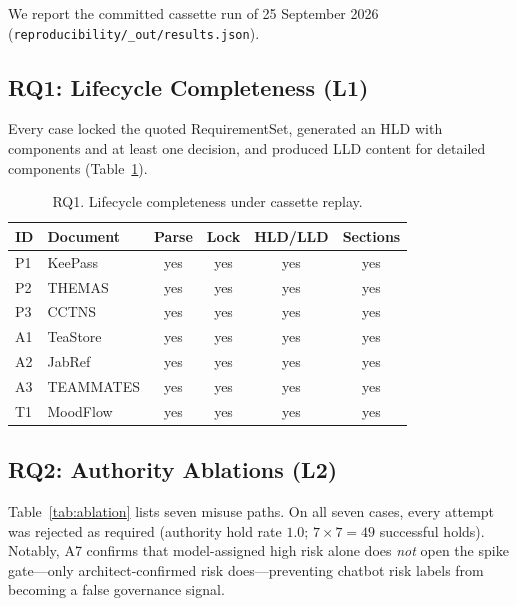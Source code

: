 \documentclass[conference]{IEEEtran}
\begin{document}
We report the committed cassette run of 25 September 2026 (\texttt{reproducibility/\_out/results.json}).

\subsection{RQ1: Lifecycle Completeness (L1)}
Every case locked the quoted RequirementSet, generated an HLD with components and at least one decision, and produced LLD content for detailed components (Table~\ref{tab:rq1}).

\begin{table}[!t]
\caption{RQ1. Lifecycle completeness under cassette replay.}
\label{tab:rq1}
\centering
\small
\begin{tabular}{@{}llcccc@{}}
\toprule
ID & Document & Parse & Lock & HLD/LLD & Sections \\
\midrule
P1 & KeePass & yes & yes & yes & yes \\
P2 & THEMAS & yes & yes & yes & yes \\
P3 & CCTNS & yes & yes & yes & yes \\
A1 & TeaStore & yes & yes & yes & yes \\
A2 & JabRef & yes & yes & yes & yes \\
A3 & TEAMMATES & yes & yes & yes & yes \\
T1 & MoodFlow & yes & yes & yes & yes \\
\bottomrule
\end{tabular}
\end{table}

\subsection{RQ2: Authority Ablations (L2)}
Table~\ref{tab:ablation} lists seven misuse paths.
On all seven cases, every attempt was rejected as required (authority hold rate $1.0$; $7\times7=49$ successful holds).
Notably, A7 confirms that model-assigned high risk alone does \emph{not} open the spike gate---only architect-confirmed risk does---preventing chatbot risk labels from becoming a false governance signal.
\end{document}
